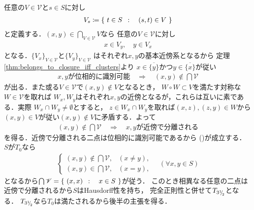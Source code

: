 	\begin{prf}
		任意の$V \in \mathscr{V}$と$s \in S$に対し
		\begin{align}
			V_s \coloneqq \left\{\ t \in S\ \, : \quad (s,t) \in V\ \right\}
		\end{align}
		と定義する．$(x,y) \in \bigcap_{V \in \mathscr{V}}V$なら
		任意の$V \in \mathscr{V}$に対し
		\begin{align}
			x \in V_y,\quad y \in V_x
		\end{align}
		となる．$\{V_x\}_{V \in \mathscr{V}}$と$\{V_y\}_{V \in \mathscr{V}}$
		はそれぞれ$x,y$の基本近傍系となるから
		定理\ref{thm:belongs_to_closure_iff_clusters}より
		$x \in \overline{\{y\}}$かつ$y \in \overline{\{x\}}$が従い
		\begin{align}
			\mbox{$x,y$が位相的に識別可能}
			\quad \Longrightarrow \quad
			(x,y) \notin \bigcap \mathscr{V}
		\end{align}
		が出る．また或る$V \in \mathscr{V}$で$(x,y) \notin V$となるとき，
		$W \circ W \subset V$を満たす対称な$W \in \mathscr{V}$を取れば
		$W_x,W_y$はそれぞれ$x,y$の近傍となるが，これらは互いに素である．実際
		$W_x \cap W_y \neq \emptyset$とすると，
		$z \in W_x \cap W_y$を取れば$(x,z),(z,y) \in W$から
		$(x,y) \in V$が従い$(x,y) \notin V$に矛盾する．よって
		\begin{align}
			(x,y) \notin \bigcap \mathscr{V}
			\quad \Longrightarrow \quad
			\mbox{$x,y$が近傍で分離される}
		\end{align}
		を得る．近傍で分離される二点は位相的に識別可能であるから
		()が成立する．
		$S$が$T_0$なら
		\begin{align}
			\begin{cases}
				(x,y) \notin \bigcap \mathscr{V}, & (x \neq y), \\
				(x,y) \in \bigcap \mathscr{V}, & (x = y),
			\end{cases}
			\quad (\forall x,y \in S)
		\end{align}
		となるから$\bigcap \mathscr{V} = \left\{\ (x,x)\ \, : \quad x \in S\ \right\}$が従う．
		このとき相異なる任意の二点は近傍で分離されるから$S$はHausdorff性を持ち，
		完全正則性と併せて$T_{3{}^1{\mskip -5mu/\mskip -3mu}_2}$となる．
		$T_{3{}^1{\mskip -5mu/\mskip -3mu}_2}$なら$T_0$は満たされるから後半の主張を得る．
		\QED
	\end{prf}
	
